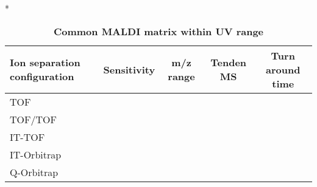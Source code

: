 \begin{table}{*}
\caption{\textbf{Common MALDI matrix within UV range}}
\label{tab:matrix}

\centering 
\scriptsize

\begin{tabular}{|l|c|c|c|c|}
    \hline 
    \textbf{Ion separation configuration} & \textbf{Sensitivity} & \textbf{m/z range} & \textbf{Tenden MS} & \textbf{Turn around time} \\ 
    \hline
    TOF & \\
    TOF/TOF \\
    IT-TOF \\
    IT-Orbitrap \\
    Q-Orbitrap \\
    \hline \hline 
\end{tabular}
\end{table}